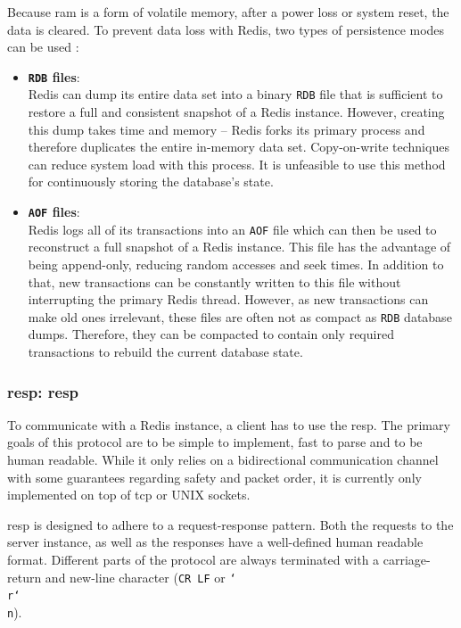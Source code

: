 Because \gls{ram} is a form of volatile memory, after a power loss or system
reset, the data is cleared. To prevent data loss with Redis, two types of
persistence modes can be used \parencite{redis:persistence}:
\begin{itemize}
    \item \textbf{\texttt{RDB} files}:\\
	Redis can dump its entire data set into a binary \texttt{RDB} file that
        is sufficient to restore a full and consistent snapshot of a Redis instance.
        However, creating this dump takes time and memory -- Redis forks its primary
        process and therefore duplicates the entire in-memory data set. Copy-on-write
        techniques can reduce system load with this process. It is unfeasible to use
        this method for continuously storing the database's state.
        \parencite{redis:persistence}

    \item \textbf{\texttt{AOF} files}:\\
	Redis logs all of its transactions into an \texttt{AOF} file which can
        then be used to reconstruct a full snapshot of a Redis instance. This file has
        the advantage of being append-only, reducing random accesses and seek times. In
        addition to that, new transactions can be constantly written to this file
        without interrupting the primary Redis thread. However, as new transactions can
        make old ones irrelevant, these files are often not as compact as \texttt{RDB}
        database dumps. Therefore, they can be compacted to contain only required
        transactions to rebuild the current database state. \parencite{redis:persistence}
\end{itemize}

\subsubsection*{\acrshort{resp}: \acrlong{resp}}
To communicate with a Redis instance, a client has to use the \gls{resp}. The
primary goals of this protocol are to be simple to implement, fast to parse and
to be human readable. While it only relies on a bidirectional communication
channel with some guarantees regarding safety and packet order, it is currently
only implemented on top of \gls{tcp} or UNIX sockets. \parencite{redis:protocol}

\gls{resp} is designed to adhere to a request-response pattern. Both the
requests to the server instance, as well as the responses have a well-defined
human readable format. Different parts of the protocol are always terminated
with a carriage-return and new-line character (\texttt{CR LF} or
\texttt{\char`\\ r\char`\\ n}). \parencite{redis:protocol}

